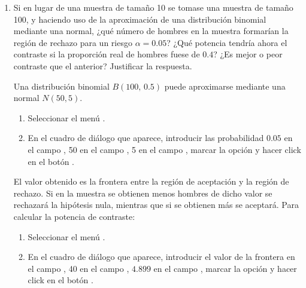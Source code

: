 \begin{enumerate}[leftmargin=*]
\begin{enumerate}
\item Si en lugar de una muestra de tamaño 10 se tomase una muestra de tamaño 100, y haciendo uso de la aproximación de
una distribución binomial mediante una normal, ¿qué número de hombres en la muestra formarían la región de rechazo para
un riesgo $\alpha=0.05$? 
¿Qué potencia tendría ahora el contraste si la proporción real de hombres fuese de $0.4$? 
¿Es mejor o peor contraste que el anterior? 
Justificar la respuesta.
\begin{indicacion}{
Una distribución binomial $B(100,\, 0.5)$ puede aproximarse mediante una normal $N(50,5)$.
\begin{enumerate}
\item Seleccionar el menú .
\item En el cuadro de diálogo que aparece, introducir las probabilidad $0.05$ en el campo , 50 en
el campo , 5 en el campo , marcar la opción  y hacer click
en el botón .
\end{enumerate}
El valor obtenido es la frontera entre la región de aceptación y la región de rechazo. 
Si en la muestra se obtienen menos hombres de dicho valor se rechazará la hipótesis nula, mientras que si se obtienen
más se aceptará. 
Para calcular la potencia de contraste:
\begin{enumerate}
\item Seleccionar el menú .
\item En el cuadro de diálogo que aparece, introducir el valor de la frontera en el campo , 40 en el campo , $4.899$ en el campo , marcar la opción  y hacer click en el botón .
\end{enumerate}}
\end{indicacion}


\end{enumerate}
\end{enumerate}
